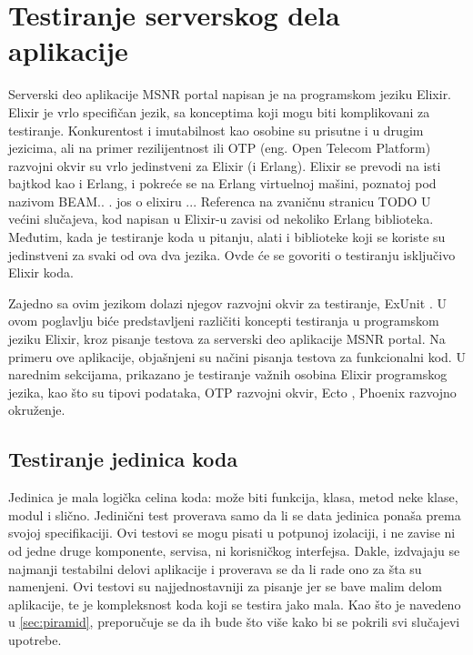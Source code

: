 \documentclass[12pt,oneside]{memoir}
\begin{document}
\chapter{Testiranje serverskog dela aplikacije}
\label{chp:elixir}
Serverski deo aplikacije MSNR portal napisan je na programskom jeziku Elixir. Elixir je vrlo specifičan jezik, sa konceptima koji mogu biti komplikovani za testiranje. Konkurentost i imutabilnost kao osobine su prisutne i u drugim jezicima, ali na primer rezilijentnost ili OTP (eng. {Open Telecom Platform}) razvojni okvir su vrlo jedinstveni za Elixir (i Erlang). Elixir se prevodi na isti bajtkod kao i Erlang, i pokreće se na Erlang virtuelnoj mašini, poznatoj pod nazivom BEAM.. . jos o elixiru ... Referenca na zvaničnu stranicu \cite{elix} TODO %
U većini slučajeva, kod napisan u Elixir-u zavisi od nekoliko Erlang biblioteka. Međutim, kada je testiranje koda u pitanju, alati i biblioteke koji se koriste su jedinstveni za svaki od ova dva jezika. Ovde će se govoriti o testiranju isključivo Elixir koda. 

Zajedno sa ovim jezikom dolazi njegov razvojni okvir za testiranje, ExUnit \cite{exunit}. U ovom poglavlju biće predstavljeni različiti koncepti testiranja u programskom jeziku Elixir, kroz pisanje testova za serverski deo aplikacije MSNR portal. Na primeru ove aplikacije, objašnjeni su načini pisanja testova za funkcionalni kod. U narednim sekcijama, prikazano je testiranje važnih osobina Elixir programskog jezika, kao što su tipovi podataka, OTP razvojni okvir, Ecto \cite{ecto}, Phoenix razvojno okruženje\cite{phoenix}.

\section{Testiranje jedinica koda}

Jedinica je mala logička celina koda: može biti funkcija, klasa, metod neke klase, modul i slično. Jedinični test proverava samo da li se data jedinica ponaša prema svojoj specifikaciji. Ovi testovi se mogu pisati u potpunoj izolaciji, i ne zavise ni od jedne druge komponente, servisa, ni korisničkog interfejsa. Dakle, izdvajaju se najmanji testabilni delovi aplikacije i proverava se da li rade ono za šta su namenjeni. Ovi testovi su najjednostavniji za pisanje jer se bave malim delom aplikacije, te je kompleksnost koda koji se testira jako mala. Kao što je navedeno u \ref{sec:piramid}, preporučuje se da ih bude što više kako bi se pokrili svi slučajevi upotrebe.
\end{document}
